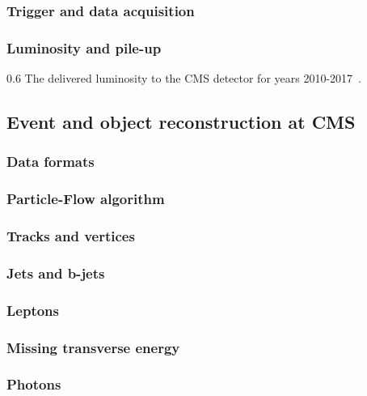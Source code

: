 \subsubsection{Trigger and data acquisition}
\subsubsection{Luminosity and pile-up}


                 {0.6}       %
                 { The delivered luminosity to the CMS detector for years 2010-2017~\cite{website:CMSlumi}. }

\newpage

\subsection{Event and object reconstruction at CMS}


\subsubsection{Data formats}
\subsubsection{Particle-Flow algorithm}
\subsubsection{Tracks and vertices}
\subsubsection{Jets and b-jets}
\subsubsection{Leptons}
\subsubsection{Missing transverse energy}
\subsubsection{Photons}

